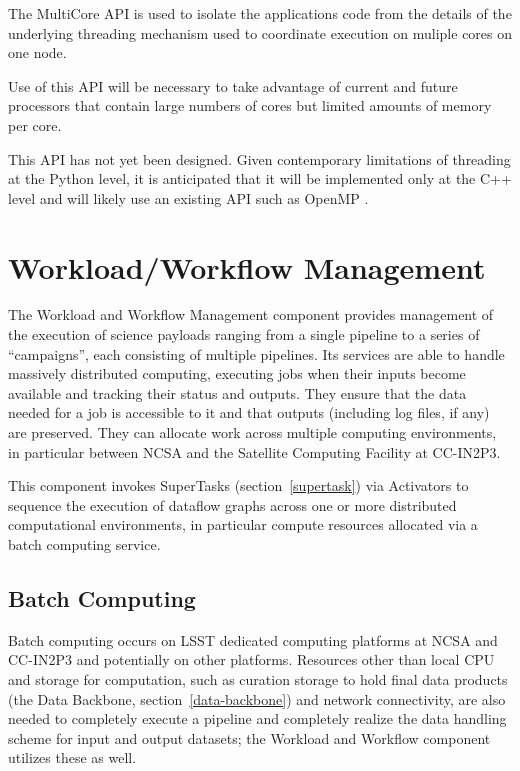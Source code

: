 \documentclass[DM,lsstdraft,toc]{lsstdoc}
\begin{document}
The MultiCore API is used to isolate the applications code from the details of
the underlying threading mechanism used to coordinate execution on muliple
cores on one node.

Use of this API will be necessary to take advantage of current and future
processors that contain large numbers of cores but limited amounts of memory
per core.

This API has not yet been designed.  Given contemporary limitations of
threading at the Python level, it is anticipated that it will be implemented
only at the C++ level and will likely use an existing API such as OpenMP
\citep{OpenMP}.


\section{Workload/Workflow Management}\label{workload-workflow-management}

The Workload and Workflow Management component provides management of the
execution of science payloads ranging from a single pipeline to a series of
``campaigns'', each consisting of multiple pipelines. Its services are able to
handle massively distributed computing, executing jobs when their inputs become
available and tracking their status and outputs. They ensure that the data
needed for a job is accessible to it and that outputs (including log files, if
any) are preserved. They can allocate work across multiple computing
environments, in particular between NCSA and the Satellite Computing Facility
at CC-IN2P3.

This component invokes SuperTasks (section~\ref{supertask}) via Activators to
sequence the execution of dataflow graphs across one or more distributed
computational environments, in particular compute resources allocated via a
batch computing service.

\subsection{Batch Computing}\label{batch-computing}

Batch computing occurs on LSST dedicated computing platforms at NCSA and
CC-IN2P3 and potentially on other platforms. Resources other than local CPU and
storage for computation, such as curation storage to hold final data products
(the Data Backbone, section~\ref{data-backbone}) and network connectivity, are
also needed to completely execute a pipeline and completely realize the data
handling scheme for input and output datasets; the Workload and Workflow
component utilizes these as well.
 
\end{document}
